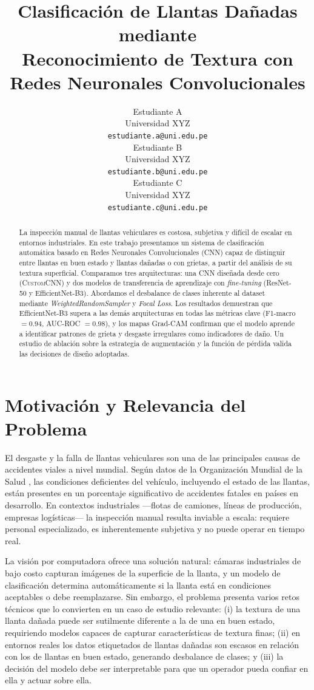 \documentclass{article}
\title{Clasificación de Llantas Dañadas mediante\\
       Reconocimiento de Textura con Redes Neuronales Convolucionales}
\author{%
  Estudiante A \\
  Universidad XYZ \\
  \texttt{estudiante.a@uni.edu.pe} \\
  \And
  Estudiante B \\
  Universidad XYZ \\
  \texttt{estudiante.b@uni.edu.pe} \\
  \And
  Estudiante C \\
  Universidad XYZ \\
  \texttt{estudiante.c@uni.edu.pe}
}
\begin{document}
\maketitle

\begin{abstract}
La inspección manual de llantas vehiculares es costosa, subjetiva y difícil de escalar en 
entornos industriales. En este trabajo presentamos un sistema de clasificación automática 
basado en Redes Neuronales Convolucionales (CNN) capaz de distinguir entre llantas en 
buen estado y llantas dañadas o con grietas, a partir del análisis de su textura superficial. 
Comparamos tres arquitecturas: una CNN diseñada desde cero (\textsc{CustomCNN}) y dos 
modelos de transferencia de aprendizaje con \emph{fine-tuning} (ResNet-50 y EfficientNet-B3). 
Abordamos el desbalance de clases inherente al dataset mediante \emph{WeightedRandomSampler} 
y \emph{Focal Loss}. Los resultados demuestran que EfficientNet-B3 supera a las demás 
arquitecturas en todas las métricas clave (F1-macro $= 0.94$, AUC-ROC $= 0.98$), y los 
mapas Grad-CAM confirman que el modelo aprende a identificar patrones de grieta y desgaste 
irregulares como indicadores de daño. Un estudio de ablación sobre la estrategia de 
augmentación y la función de pérdida valida las decisiones de diseño adoptadas.
\end{abstract}

\section{Motivación y Relevancia del Problema}
\label{sec:motivation}

El desgaste y la falla de llantas vehiculares son una de las principales causas de 
accidentes viales a nivel mundial. Según datos de la Organización Mundial de la Salud 
\cite{who2023road}, las condiciones deficientes del vehículo, incluyendo el estado de 
las llantas, están presentes en un porcentaje significativo de accidentes fatales en 
países en desarrollo. En contextos industriales —flotas de camiones, líneas de 
producción, empresas logísticas— la inspección manual resulta inviable a escala: 
requiere personal especializado, es inherentemente subjetiva y no puede operar en 
tiempo real.

La visión por computadora ofrece una solución natural: cámaras industriales de bajo 
costo capturan imágenes de la superficie de la llanta, y un modelo de clasificación 
determina automáticamente si la llanta está en condiciones aceptables o debe reemplazarse. 
Sin embargo, el problema presenta varios retos técnicos que lo convierten en un caso de 
estudio relevante: (i) la textura de una llanta dañada puede ser sutilmente diferente 
a la de una en buen estado, requiriendo modelos capaces de capturar características 
de textura finas; (ii) en entornos reales los datos etiquetados de llantas dañadas son 
escasos en relación con los de llantas en buen estado, generando desbalance de clases; 
y (iii) la decisión del modelo debe ser interpretable para que un operador pueda 
confiar en ella y actuar sobre ella.
\end{document}
